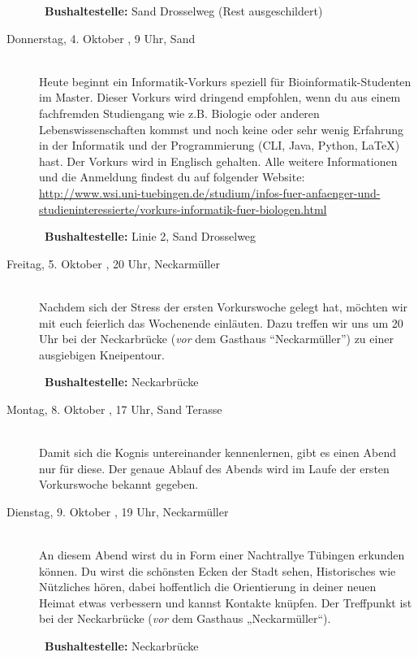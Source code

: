 \begin{description}
~\textbf{Bushaltestelle:} Sand Drosselweg (Rest ausgeschildert)

\ifmaster
\ifbinfo
\item[Donnerstag, 4. Oktober \YEAR, 9 Uhr, Sand]\ \\
 Heute beginnt ein Informatik-Vorkurs speziell für Bioinformatik-Studenten im Master. Dieser Vorkurs wird dringend empfohlen, wenn du aus einem fachfremden Studiengang wie z.B. Biologie oder anderen Lebenswissenschaften kommst und noch keine oder sehr wenig Erfahrung in der Informatik und der Programmierung (CLI, Java, Python, \LaTeX) hast. Der Vorkurs wird in Englisch gehalten. Alle weitere Informationen und die Anmeldung findest du auf folgender Website: \\ \url{http://www.wsi.uni-tuebingen.de/studium/infos-fuer-anfaenger-und-studieninteressierte/vorkurs-informatik-fuer-biologen.html}

~\textbf{Bushaltestelle:} Linie 2, Sand Drosselweg
\fi
\fi


\item[Freitag, 5. Oktober \YEAR, 20 Uhr, Neckarmüller]\ \\
Nachdem sich der Stress der ersten Vorkurswoche gelegt hat, möchten wir mit euch feierlich das Wochenende einläuten.
Dazu treffen wir uns um 20 Uhr bei der Neckarbrücke (\emph{vor} dem Gasthaus "`Neckarmüller"') zu einer ausgiebigen Kneipentour.

~\textbf{Bushaltestelle:} Neckarbrücke


\ifkogwiss

\item[Montag, 8. Oktober \YEAR, 17 Uhr, Sand Terasse ]\ \\
Damit sich die Kognis untereinander kennenlernen, gibt es einen Abend nur für diese. Der genaue Ablauf des Abends wird im Laufe der ersten Vorkurswoche bekannt gegeben.
\fi

\item[Dienstag, 9. Oktober \YEAR, 19 Uhr, Neckarmüller]\ \\
An diesem Abend wirst du in Form einer Nachtrallye Tübingen erkunden können. Du wirst die schönsten Ecken der Stadt sehen, Historisches wie Nützliches hören, dabei hoffentlich die Orientierung in deiner neuen Heimat etwas verbessern und kannst Kontakte knüpfen. Der Treffpunkt ist bei der Neckarbrücke (\emph{vor} dem Gasthaus „Neckarmüller“).

~\textbf{Bushaltestelle:} Neckarbrücke


\end{description}
